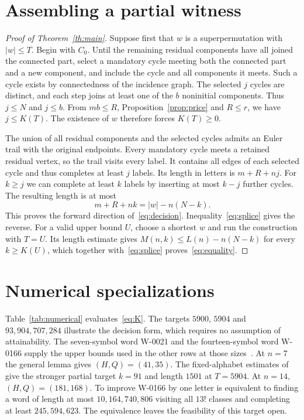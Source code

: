 \documentclass[11pt]{article}
\begin{document}
\section{Assembling a partial witness}
\begin{proof}[Proof of Theorem~\ref{th:main}]
Suppose first that $w$ is a superpermutation with $|w|\le T$. Begin with $C_0$. Until the remaining residual components have all joined the connected part, select a mandatory cycle meeting both the connected part and a new component, and include the cycle and all components it meets. Such a cycle exists by connectedness of the incidence graph. The selected $j$ cycles are distinct, and each step joins at least one of the $b$ noninitial components. Thus $j\le N$ and $j\le b$. From $mb\le R$, Proposition~\ref{prop:price} and $R\le r$, we have $j\le K(T)$. The existence of $w$ therefore forces $K(T)\ge0$.

The union of all residual components and the selected cycles admits an Euler trail with the original endpoints. Every mandatory cycle meets a retained residual vertex, so the trail visits every label. It contains all edges of each selected cycle and thus completes at least $j$ labels. Its length in letters is $m+R+nj$. For $k\ge j$ we can complete at least $k$ labels by inserting at most $k-j$ further cycles. The resulting length is at most
\[
   m+R+nk=|w|-n(N-k).
\]
This proves the forward direction of~\eqref{eq:decision}. Inequality~\eqref{eq:splice} gives the reverse. For a valid upper bound $U$, choose a shortest $w$ and run the construction with $T=U$. Its length estimate gives $M(n,k)\le L(n)-n(N-k)$ for every $k\ge K(U)$, which together with~\eqref{eq:splice} proves~\eqref{eq:equality}.
\end{proof}

\section{Numerical specializations}
Table~\ref{tab:numerical} evaluates~\eqref{eq:K}. The targets $5900$, $5904$ and $93{,}904{,}707{,}284$ illustrate the decision form, which requires no assumption of attainability. The seven-symbol word W-0021 and the fourteen-symbol word W-0166 supply the upper bounds used in the other rows at those sizes~\cite{almanac}. At $n=7$ the general lemma gives $(H,Q)=(41,35)$. The fixed-alphabet estimates of~\cite{seven} give the stronger partial target $k=91$ and length $1501$ at $T=5904$. At $n=14$, $(H,Q)=(181,168)$. To improve W-0166 by one letter is equivalent to finding a word of length at most $10{,}164{,}740{,}806$ visiting all $13!$ classes and completing at least $245{,}594{,}623$. The equivalence leaves the feasibility of this target open.
\end{document}
